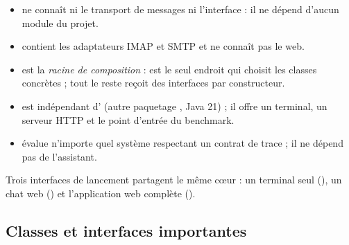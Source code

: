 \begin{itemize}
  \item {} ne connaît ni le transport de messages ni l'interface : il ne dépend d'aucun module du projet.
  \item {} contient les adaptateurs IMAP et SMTP et ne connaît pas le web.
  \item {} est la \emph{racine de composition} :  est le seul endroit qui choisit les classes concrètes ; tout le reste reçoit des interfaces par constructeur.
  \item {} est indépendant d' (autre paquetage , Java 21) ; il offre un terminal, un serveur HTTP et le point d'entrée du benchmark.
  \item {} évalue n'importe quel système respectant un contrat de trace ; il ne dépend pas de l'assistant.
\end{itemize}

Trois interfaces de lancement partagent le même cœur : un terminal seul (), un chat web () et l'application web complète ().

\subsection{Classes et interfaces importantes}

